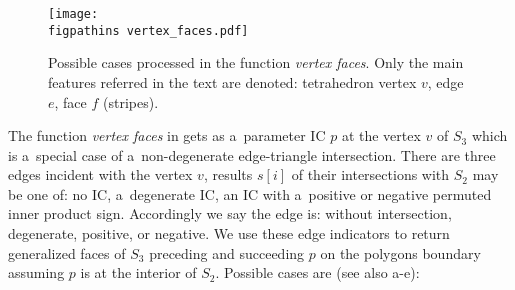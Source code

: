 \begin{figure}[!htb]
    \centering    
    \texttt{[image: \\figpathins vertex\_faces.pdf]}
    \caption[Possible cases processed in the vertex faces function.]
    {Possible cases processed in the function \emph{vertex faces}.
        Only the main features referred in the text are denoted: tetrahedron vertex $v$, edge $e$, face $f$ (stripes).}
    \label{fig:vertex_faces}
\end{figure}

The function \emph{vertex faces} in  gets as a~parameter IC $p$ at the vertex $v$ of $S_3$ 
which is a~special case of a~non-degenerate edge-triangle intersection. There are three
edges incident with the vertex $v$, results $s[i]$ of their intersections with $S_2$ may be one of: no IC, 
a~degenerate IC, an IC with a~positive or negative permuted inner product sign.
Accordingly we say the edge is: without intersection, degenerate, positive, or negative. 
We use these edge indicators to return generalized faces of $S_3$ preceding and succeeding $p$ on the polygons boundary assuming $p$ is at the interior of $S_2$.
Possible cases are (see also  a-e):
